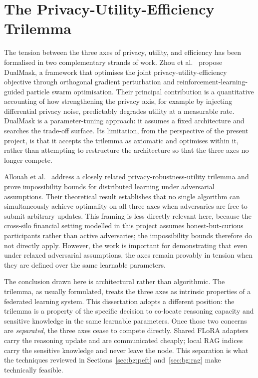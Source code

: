 \documentclass{report}
\begin{document}
\section{The Privacy-Utility-Efficiency Trilemma}
\label{sec:bg:trilemma}

The tension between the three axes of privacy, utility, and efficiency has been formalised in two complementary strands of work. Zhou et al.~\cite{plosone2023e0338822} propose DualMask, a framework that optimises the joint privacy-utility-efficiency objective through orthogonal gradient perturbation and reinforcement-learning-guided particle swarm optimisation. Their principal contribution is a quantitative accounting of how strengthening the privacy axis, for example by injecting differential privacy noise, predictably degrades utility at a measurable rate. DualMask is a parameter-tuning approach: it assumes a fixed architecture and searches the trade-off surface. Its limitation, from the perspective of the present project, is that it accepts the trilemma as axiomatic and optimises within it, rather than attempting to restructure the architecture so that the three axes no longer compete.

Allouah et al.~\cite{allouah2023trilemma} address a closely related privacy-robustness-utility trilemma and prove impossibility bounds for distributed learning under adversarial assumptions. Their theoretical result establishes that no single algorithm can simultaneously achieve optimality on all three axes when adversaries are free to submit arbitrary updates. This framing is less directly relevant here, because the cross-silo financial setting modelled in this project assumes honest-but-curious participants rather than active adversaries; the impossibility bounds therefore do not directly apply. However, the work is important for demonstrating that even under relaxed adversarial assumptions, the axes remain provably in tension when they are defined over the same learnable parameters.

The conclusion drawn here is architectural rather than algorithmic. The trilemma, as usually formulated, treats the three axes as intrinsic properties of a federated learning system. This dissertation adopts a different position: the trilemma is a property of the specific decision to co-locate reasoning capacity and sensitive knowledge in the same learnable parameters. Once those two concerns are \textit{separated}, the three axes cease to compete directly. Shared FLoRA adapters carry the reasoning update and are communicated cheaply; local RAG indices carry the sensitive knowledge and never leave the node. This separation is what the techniques reviewed in Sections~\ref{sec:bg:peft} and~\ref{sec:bg:rag} make technically feasible.
\end{document}
